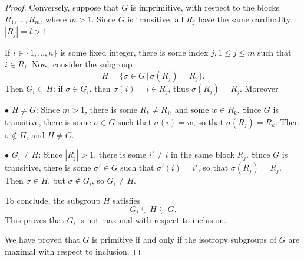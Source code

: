 \documentclass[11pt,a4paper]{article}
\begin{document}
\begin{proof}
\bigskip

Conversely, suppose that $G$ is imprimitive, with respect to the blocks $R_1,\ldots,R_m$, where $m>1$. Since $G$ is transitive, all $R_j$ have the same cardinality $|R_j| = l >1$. 

If $i \in \{1,\ldots,n\}$ is some fixed integer, there is some index $j, 1\leq j \leq m$ such that $i \in R_j$. Now, consider the subgroup
$$H = \{\sigma\in G\, |\, \sigma(R_j) = R_j\}.$$
Then $G_i \subset H$: if $\sigma \in G_i$, then $\sigma(i) = i \in R_j$, thus $\sigma(R_j) = R_j$. Moreover

$\bullet$ $H\ne G$: Since $m>1$, there is some $R_k \ne R_j$, and some $w \in R_k$. Since $G$ is transitive, there is some $\sigma \in G$ such that $\sigma(i) = w$, so that $\sigma(R_j) = R_k$. Then $\sigma \not \in H$, and $H \ne G$.

$\bullet$ $G_i \ne H$: Since $|R_j|>1$, there is some $i'\ne i$ in the same block $R_j$. Since $G$ is transitive, there is some $\sigma' \in G$ such that $\sigma'(i) = i'$, so that $\sigma(R_j) = R_j$. Then $\sigma \in H$, but $\sigma \not \in G_i$, so $G_i \ne H$.

To conclude, the subgroup $H$ satisfies
$$G_i \subsetneq H \subsetneq G.$$
This proves that $G_i$ is not maximal with respect to inclusion.

We have proved that $G$ is primitive if and only if the isotropy subgroups of $G$ are maximal with respect to inclusion.

\end{proof}
\end{document}
